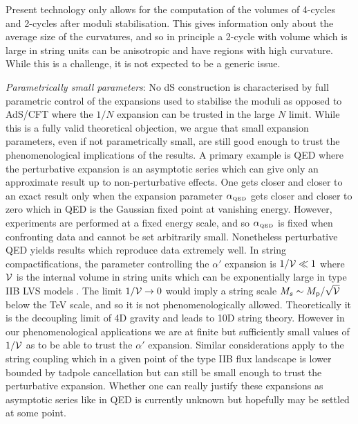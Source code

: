 \documentclass[11pt,a4paper]{article}
\newcommand{\vo}{\mathcal{V}}
\def\QED{{\scriptscriptstyle \rm QED}}
\def\vo{{{\cal{V}}}}
\def\QED{{\scriptscriptstyle {\rm QED}}}
\begin{document}
Present technology only allows for the computation of the volumes of 4-cycles and 2-cycles after moduli stabilisation. This gives information only about the average size of the curvatures, and so in principle a 2-cycle with volume which is large in string units can be anisotropic and have regions with high curvature. While this is a challenge, it is not expected to be a generic issue. 

\item \emph{Parametrically small parameters}: No dS construction is characterised by full parametric control of the expansions used to stabilise the moduli as opposed to AdS/CFT where the $1/N$ expansion can be trusted in the large $N$ limit. While this is a fully valid theoretical objection, we argue that small expansion parameters, even if not parametrically small, are still good enough to trust the phenomenological implications of the results. A primary example is QED where the perturbative expansion is an asymptotic series which can give only an approximate result up to non-perturbative effects. One gets closer and closer to an exact result only when the expansion parameter $\alpha_\QED$ gets closer and closer to zero which in QED is the Gaussian fixed point at vanishing energy. However, experiments are performed at a fixed energy scale, and so $\alpha_\QED$ is fixed when confronting data and cannot be set arbitrarily small. Nonetheless perturbative QED yields results which reproduce data extremely well. In string compactifications, the parameter controlling the $\alpha'$ expansion is $1/\vo \ll 1$ where $\vo$ is the internal volume in string units which can be exponentially large in type IIB LVS models \cite{Balasubramanian:2005zx, Conlon:2005ki, Cicoli:2008va}. The limit $1/\vo \to 0$ would imply a string scale $M_s\sim M_{\rm p}/\sqrt{\vo}$ below the TeV scale, and so it is not phenomenologically allowed. Theoretically it is the decoupling limit of 4D gravity and leads to 10D string theory. However in our phenomenological applications we are at finite but sufficiently small values of $1/\vo$ as to be able to trust the $\alpha'$ expansion. Similar considerations apply to the string coupling which in a given point of the type IIB flux landscape is lower bounded by tadpole cancellation but can still be small enough to trust the perturbative expansion. Whether one can really justify these expansions as asymptotic series like in QED is currently unknown but hopefully may be settled at some point.
\end{document}
